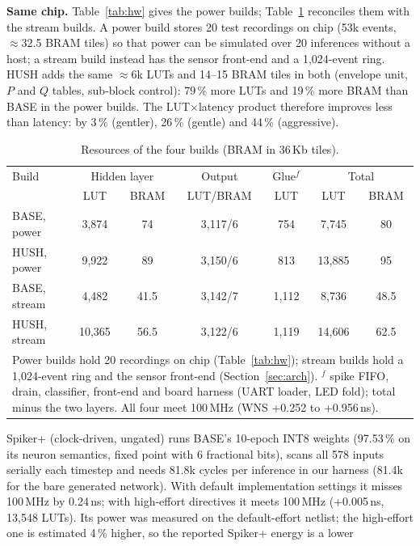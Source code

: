 \documentclass[conference]{IEEEtran}
\begin{document}
\textbf{Same chip.} Table~\ref{tab:hw} gives the power builds; Table~\ref{tab:res} reconciles them with the stream
builds. A power build stores 20 test recordings on chip (53k events, $\approx$32.5 BRAM tiles) so that power can be
simulated over 20 inferences without a host; a stream build instead has the sensor front-end and a 1,024-event
ring. HUSH adds the same $\approx$6k LUTs and 14--15 BRAM tiles in both (envelope unit, $P$ and $Q$ tables,
sub-block control): 79\,\% more LUTs and 19\,\% more BRAM than BASE in the power builds. The LUT$\times$latency
product therefore improves less than latency: by 3\,\% (gentler), 26\,\% (gentle) and 44\,\% (aggressive).

\begin{table}[t]\centering\caption{Resources of the four builds (BRAM in 36\,Kb tiles).}\label{tab:res}
\setlength{\tabcolsep}{2.2pt}\footnotesize
\begin{tabular}{lcccccc}\toprule
Build & \multicolumn{2}{c}{Hidden layer} & Output & Glue$^f$ & \multicolumn{2}{c}{Total}\\
 & LUT & BRAM & LUT/BRAM & LUT & LUT & BRAM\\\midrule
BASE, power & 3,874 & 74 & 3,117/6 & 754 & 7,745 & 80\\
HUSH, power & 9,922 & 89 & 3,150/6 & 813 & 13,885 & 95\\
BASE, stream & 4,482 & 41.5 & 3,142/7 & 1,112 & 8,736 & 48.5\\
HUSH, stream & 10,365 & 56.5 & 3,122/6 & 1,119 & 14,606 & 62.5\\\bottomrule
\multicolumn{7}{p{0.95\columnwidth}}{\footnotesize Power builds hold 20 recordings on chip (Table~\ref{tab:hw});
stream builds hold a 1,024-event ring and the sensor front-end (Section~\ref{sec:arch}). $^f$ spike FIFO, drain, classifier,
front-end and board harness (UART loader, LED fold); total minus the two layers. All four meet 100\,MHz (WNS +0.252 to +0.956\,ns).}
\end{tabular}\end{table} Spiker+ (clock-driven, ungated) runs BASE's 10-epoch INT8 weights (97.53\,\% on its neuron semantics, fixed point
with 6 fractional bits), scans all 578 inputs serially each timestep and needs 81.8k cycles per inference in our
harness (81.4k for the bare generated network). With default implementation settings it misses 100\,MHz by
0.24\,ns; with high-effort directives it meets 100\,MHz (+0.005\,ns, 13,548 LUTs). Its power was measured on the
default-effort netlist; the high-effort one is estimated 4\,\% higher, so the reported Spiker+ energy is a lower
\end{document}
